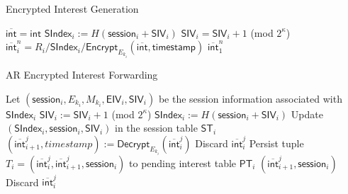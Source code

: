 \begin{algorithm}[ht!]
  \caption{Encrypted Interest Generation}
  \begin{algorithmic}[1]
\State $\overline{\mathsf{int}} = \mathsf{int}$
  \State $\mathsf{SIndex}_i := H(\mathsf{session}_i + \mathsf{SIV}_i)$
  \State $\mathsf{SIV}_i = \mathsf{SIV}_i + 1$ (mod $2^{\kappa}$)
  \State $\overline{\mathsf{int}}_i^n = R_i / \mathsf{SIndex}_i / \mathsf{Encrypt}_{E_{k_i}}(\overline{\mathsf{int}}, \mathsf{timestamp})$
\EndFor
\State \Return $\overline{\mathsf{int}}_1^n$
\end{algorithmic}
\label{alg:enc_int_gen}
\end{algorithm}

\begin{algorithm*}[ht!]
  \caption{AR Encrypted Interest Forwarding}
  \begin{algorithmic}[1]
  \State Let $(\mathsf{session}_i, E_{k_i}, M_{k_i}, \mathsf{EIV}_i, \mathsf{SIV}_i)$ be the session information associated with $\mathsf{SIndex}_i$
  \State $\mathsf{SIV}_i := \mathsf{SIV}_i + 1$ (mod $2^{\kappa}$)
  \State $\mathsf{SIndex}_i := H(\mathsf{session}_i + \mathsf{SIV}_i)$
  \State Update $(\mathsf{SIndex}_i, \mathsf{session}_i, \mathsf{SIV}_i)$ in the session table $\mathsf{ST}_i$
  \State $(\overline{\mathsf{int}}_{i+1}^{j}, timestamp) := \mathsf{Decrypt}_{E_{k_i}}(\overline{\mathsf{int}}_{i}^{j})$
    \State Discard $\overline{\mathsf{int}}_{i}^{j}$
  \Else
    \State Persist tuple $T_i = (\overline{\mathsf{int}}_{i}^{j}, \overline{\mathsf{int}}_{i+1}^{j}, \mathsf{session}_i)$ to pending interest table $\mathsf{PT}_i$
    \State \Return $(\overline{\mathsf{int}}_{i+1}^{j}, \mathsf{session}_i)$
  \EndIf
\Else
  \State Discard $\overline{\mathsf{int}}_{i}^{j}$ %
\EndIf
\end{algorithmic}
\label{alg:enc_int_forward}
\end{algorithm*}

